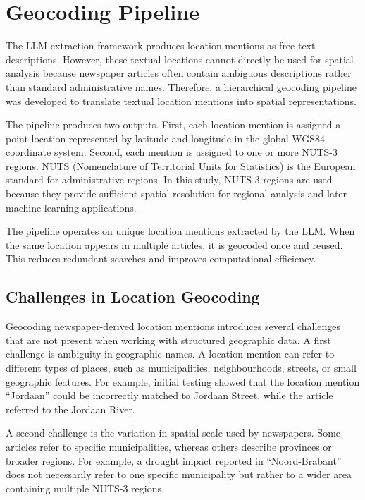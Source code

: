 \section{Geocoding Pipeline}

The LLM extraction framework produces location mentions as free-text descriptions. However, these textual locations cannot directly be used for spatial analysis because newspaper articles often contain ambiguous descriptions rather than standard administrative names. Therefore, a hierarchical geocoding pipeline was developed to translate textual location mentions into spatial representations.

The pipeline produces two outputs. First, each location mention is assigned a point location represented by latitude and longitude in the global WGS84 coordinate system. Second, each mention is assigned to one or more NUTS-3 regions. NUTS (Nomenclature of Territorial Units for Statistics) is the European standard for administrative regions. In this study, NUTS-3 regions are used because they provide sufficient spatial resolution for regional analysis and later machine learning applications.

The pipeline operates on unique location mentions extracted by the LLM. When the same location appears in multiple articles, it is geocoded once and reused. This reduces redundant searches and improves computational efficiency.

\subsection{Challenges in Location Geocoding}

Geocoding newspaper-derived location mentions introduces several challenges that are not present when working with structured geographic data. A first challenge is ambiguity in geographic names. A location mention can refer to different types of places, such as municipalities, neighbourhoods, streets, or small geographic features. For example, initial testing showed that the location mention ``Jordaan'' could be incorrectly matched to Jordaan Street, while the article referred to the Jordaan River.

A second challenge is the variation in spatial scale used by newspapers. Some articles refer to specific municipalities, whereas others describe provinces or broader regions. For example, a drought impact reported in ``Noord-Brabant'' does not necessarily refer to one specific municipality but rather to a wider area containing multiple NUTS-3 regions.

